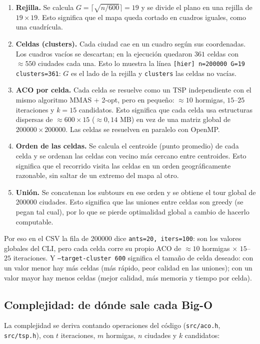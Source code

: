 \documentclass[12pt,a4paper]{article}
\begin{document}
\begin{enumerate}
\item \textbf{Rejilla.} Se calcula $G = \lceil\sqrt{n/600}\rceil = 19$ y se
divide el plano en una rejilla de $19 \times 19$. Esto significa que el mapa
queda cortado en cuadros iguales, como una cuadrícula.
\item \textbf{Celdas (clusters).} Cada ciudad cae en un cuadro según sus
coordenadas. Los cuadros vacíos se descartan; en la ejecución quedaron
$361$ celdas con $\approx 550$ ciudades cada una. Esto lo muestra la línea
\texttt{[hier] n=200000 G=19 clusters=361}: $G$ es el lado de la rejilla y
\texttt{clusters} las celdas no vacías.
\item \textbf{ACO por celda.} Cada celda se resuelve como un TSP independiente
con el mismo algoritmo MMAS + 2-opt, pero en pequeño: $\approx 10$ hormigas,
$15$--$25$ iteraciones y $k = 15$ candidatos. Esto significa que cada celda
usa estructuras dispersas de $\approx 600 \times 15$ ($\approx 0,14$ MB) en vez de
una matriz global de $200000 \times 200000$. Las celdas se resuelven en paralelo
con OpenMP.
\item \textbf{Orden de las celdas.} Se calcula el centroide (punto promedio) de
cada celda y se ordenan las celdas con vecino más cercano entre centroides.
Esto significa que el recorrido visita las celdas en un orden geográficamente
razonable, sin saltar de un extremo del mapa al otro.
\item \textbf{Unión.} Se concatenan los subtours en ese orden y se obtiene el
tour global de 200000 ciudades. Esto significa que las uniones entre celdas
son greedy (se pegan tal cual), por lo que se pierde optimalidad global a
cambio de hacerlo computable.
\end{enumerate}

Por eso en el CSV la fila de 200000 dice \texttt{ants=20, iters=100}: son los
valores globales del CLI, pero cada celda corre su propio ACO de
$\approx 10$ hormigas $\times$ $15$--$25$ iteraciones. Y
\texttt{--target-cluster 600} significa el tamaño de celda deseado: con un
valor menor hay más celdas (más rápido, peor calidad en las uniones); con un
valor mayor hay menos celdas (mejor calidad, más memoria y tiempo por celda).

\subsection{Complejidad: de dónde sale cada Big-O}

La complejidad se deriva contando operaciones del código (\texttt{src/aco.h},
\texttt{src/tsp.h}), con $t$ iteraciones, $m$ hormigas, $n$ ciudades y $k$
candidatos:
\end{document}
